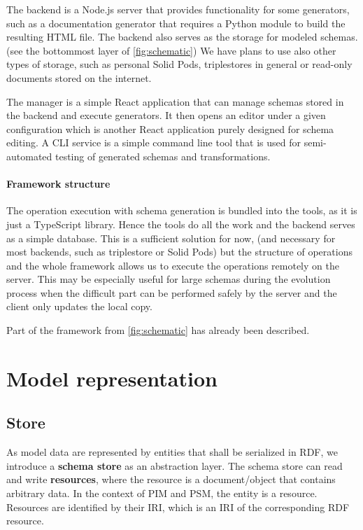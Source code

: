 The backend is a Node.js server that provides functionality for some generators, such as a documentation generator that requires a Python module to build the resulting HTML file. The backend also serves as the storage for modeled schemas. (see the bottommost layer of \autoref{fig:schematic}) We have plans to use also other types of storage, such as personal Solid Pods, triplestores in general or read-only documents stored on the internet.

The manager is a simple React application that can manage schemas stored in the backend and execute generators. It then opens an editor under a given configuration which is another React application purely designed for schema editing. A CLI service is a simple command line tool that is used for semi-automated testing of generated schemas and transformations.

\paragraph{Framework structure} The operation execution with schema generation is bundled into the tools, as it is just a TypeScript library. Hence the tools do all the work and the backend serves as a simple database. This is a sufficient solution for now, (and necessary for most backends, such as triplestore or Solid Pods) but the structure of operations and the whole framework allows us to execute the operations remotely on the server. This may be especially useful for large schemas during the evolution process when the difficult part can be performed safely by the server and the client only updates the local copy.

Part of the framework from \autoref{fig:schematic} has already been described.

\section{Model representation}

\subsection{Store}

As model data are represented by entities that shall be serialized in RDF, we introduce a \textbf{schema store} as an abstraction layer. The schema store can read and write \textbf{resources}, where the resource is a document/object that contains arbitrary data. In the context of PIM and PSM, the entity is a resource. Resources are identified by their IRI, which is an IRI of the corresponding RDF resource.

